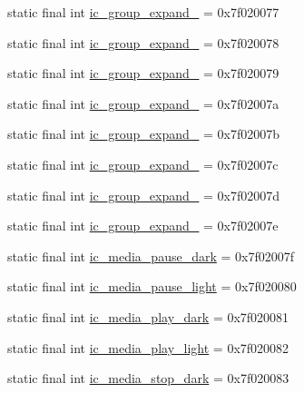 \begin{CompactItemize}
static final int \hyperlink{classandroid_1_1support_1_1v7_1_1recyclerview_1_1_r_1_1drawable_3ad9db57ada79e0931e58e124ccfab90}{ic\_\-group\_\-expand\_} = 0x7f020077
\item 
static final int \hyperlink{classandroid_1_1support_1_1v7_1_1recyclerview_1_1_r_1_1drawable_96a5b471749ac221a1a122cd434103ea}{ic\_\-group\_\-expand\_} = 0x7f020078
\item 
static final int \hyperlink{classandroid_1_1support_1_1v7_1_1recyclerview_1_1_r_1_1drawable_9d9a575f4f8052d2eed2fe6374691456}{ic\_\-group\_\-expand\_} = 0x7f020079
\item 
static final int \hyperlink{classandroid_1_1support_1_1v7_1_1recyclerview_1_1_r_1_1drawable_f6510be053544edd9f2bd96d96155625}{ic\_\-group\_\-expand\_} = 0x7f02007a
\item 
static final int \hyperlink{classandroid_1_1support_1_1v7_1_1recyclerview_1_1_r_1_1drawable_950473bbac8ec7a4095d076b8133cc42}{ic\_\-group\_\-expand\_} = 0x7f02007b
\item 
static final int \hyperlink{classandroid_1_1support_1_1v7_1_1recyclerview_1_1_r_1_1drawable_8c4b99efa29bcd9e057217d582387dcd}{ic\_\-group\_\-expand\_} = 0x7f02007c
\item 
static final int \hyperlink{classandroid_1_1support_1_1v7_1_1recyclerview_1_1_r_1_1drawable_e851e20b1c1580a83bcd689d31416960}{ic\_\-group\_\-expand\_} = 0x7f02007d
\item 
static final int \hyperlink{classandroid_1_1support_1_1v7_1_1recyclerview_1_1_r_1_1drawable_a81a54c056663b199035bff96af33dad}{ic\_\-group\_\-expand\_} = 0x7f02007e
\item 
static final int \hyperlink{classandroid_1_1support_1_1v7_1_1recyclerview_1_1_r_1_1drawable_4366db44701f3ab64e61f73469e78dda}{ic\_\-media\_\-pause\_\-dark} = 0x7f02007f
\item 
static final int \hyperlink{classandroid_1_1support_1_1v7_1_1recyclerview_1_1_r_1_1drawable_daad03a86166108879765929ff7a5326}{ic\_\-media\_\-pause\_\-light} = 0x7f020080
\item 
static final int \hyperlink{classandroid_1_1support_1_1v7_1_1recyclerview_1_1_r_1_1drawable_8661936d033f2c203eab35f8da7b1b9b}{ic\_\-media\_\-play\_\-dark} = 0x7f020081
\item 
static final int \hyperlink{classandroid_1_1support_1_1v7_1_1recyclerview_1_1_r_1_1drawable_6c8ad33f9f132aa31f6eb47334fe8d9e}{ic\_\-media\_\-play\_\-light} = 0x7f020082
\item 
static final int \hyperlink{classandroid_1_1support_1_1v7_1_1recyclerview_1_1_r_1_1drawable_255f150713aecd47362fc09f5c25dd1d}{ic\_\-media\_\-stop\_\-dark} = 0x7f020083

\end{CompactItemize}
